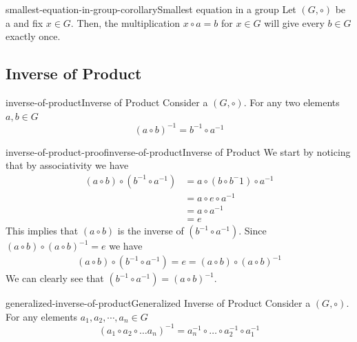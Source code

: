 \documentclass[preview]{standalone}
\begin{document}
\begin{snippetcorollary}{smallest-equation-in-group-corollary}{Smallest equation in a group}
    Let \((G, \circ)\) be a \group and fix \(x\in G\).
    Then, the multiplication \(x \circ a = b\) for \(x\in G\) will give every \(b \in G\)
    exactly once.
\end{snippetcorollary}

\subsection{Inverse of Product}

\begin{snippettheorem}{inverse-of-product}{Inverse of Product}
    Consider a \group \((G, \circ)\). For any two elements \(a,b \in G\)
    \[{(a \circ b)}^{-1} = b^{-1} \circ a^{-1}\]
\end{snippettheorem}

\begin{snippetproof}{inverse-of-product-proof}{inverse-of-product}{Inverse of Product}
    We start by noticing that by associativity we have
    \begin{align*}
        (a \circ b) \circ (b^{-1} \circ a^{-1}) &= a \circ (b \circ b^-1) \circ a^{-1} \\
        &= a \circ e \circ a^{-1} \\
        &= a \circ a^{-1} \\
        &= e
    \end{align*}
    This implies that \((a \circ b)\) is the inverse of \((b^{-1} \circ a^{-1})\).
    Since \((a\circ b) \circ {(a \circ b)}^{-1} =e\) we have
    \begin{align*}
        (a \circ b) \circ (b^{-1} \circ a^{-1}) = e = (a\circ b) \circ {(a \circ b)}^{-1}
    \end{align*}
    We can clearly see that \((b^{-1} \circ a^{-1}) = {(a \circ b)}^{-1}\).
\end{snippetproof}

\begin{snippettheorem}{generalized-inverse-of-product}{Generalized Inverse of Product}
    Consider a \group \((G, \circ)\). For any elements \(a_1,a_2,\cdots,a_n \in G\)
    \[
        (a_1 \circ a_2 \circ \dots a_n)^{-1}
        = a_n^{-1} \circ \dots \circ a_2^{-1} \circ a_1^{-1}
    \]
\end{snippettheorem}
\end{document}
